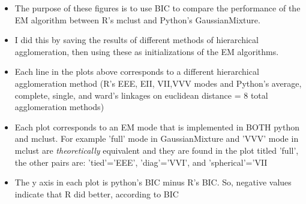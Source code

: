 \documentclass{article}
\begin{document}
\begin{itemize}
\item The purpose of these figures is to use BIC to compare the performance of the EM algorithm between R's mclust and Python's GaussianMixture. 
\item I did this by saving the results of different methods of hierarchical agglomeration, then using these as initializations of the EM algorithms. 
\item Each line in the plots above corresponds to a different hierarchical agglomeration method (R's EEE, EII, VII,VVV modes and Python's average, complete, single, and ward's linkages on euclidean distance = 8 total agglomeration methods)
\item Each plot corresponds to an EM mode that is implemented in BOTH python and mclust. For example 'full' mode in GaussianMixture and 'VVV' mode in mclust are \textit{theoretically} equivalent and they are found in the plot titled 'full', the other pairs are: 'tied'='EEE', 'diag'='VVI', and 'spherical'='VII
\item The y axis in each plot is python's BIC minus R's BIC. So, negative values indicate that R did better, according to BIC
\end{itemize}
\end{document}
